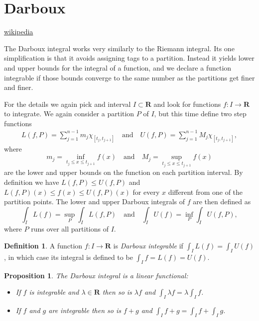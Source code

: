 \documentclass[11pt]{amsart}
\newtheorem{prop}[theo]{Proposition}
\theoremstyle{definition}
\newtheorem{defi}[theo]{Definition}
\def\qandq{\quad\text{and}\quad}
\def\RR{\mathbf{R}}
\begin{document}
\section{Darboux}

\href{https://en.wikipedia.org/wiki/Darboux_integral}{wikipedia}

The Darboux integral works very similarly to the Riemann integral.
Its one simplification is that it avoids assigning tags to a partition.
Instead it yields lower and upper bounds for the integral of a function, and we declare a function integrable if those bounds converge to the same number as the partitions get finer and finer.

For the details we again pick and interval $I \subset \RR$ and look for functions $f : I \to \RR$ to integrate.
We again consider a partition $P$ of $I$, but this time define two step functions
\begin{align*}
L(f,P) = \sum_{j=1}^{n-1} m_j \chi_{[t_j, t_{j+1}]}
\qandq
U(f,P) = \sum_{j=1}^{n-1} M_j \chi_{[t_j, t_{j+1}]},
\end{align*}
where
\[
m_j = \inf_{t_j \leq x \leq t_{j+1}} f(x)
\qandq
M_j = \sup_{t_j \leq x \leq t_{j+1}} f(x)
\]
are the lower and upper bounds on the function on each partition interval.
By definition we have $L(f,P) \leq U(f,P)$ and $L(f,P)(x) \leq f(x) \leq U(f,P)(x)$ for every $x$ different from one of the partition points.
The lower and upper Darboux integrals of $f$ are then defined as
\[
\int_I L(f) = \sup_{P} \int_I L(f,P)
\qandq
\int_I U(f) = \inf_{P} \int_I U(f,P),
\]
where $P$ runs over all partitions of $I$.


\begin{defi}
A function $f : I \to \RR$ is \emph{Darboux integrable} if $\int_I L(f) = \int_I U(f)$, in which case its integral is defined to be $\int_I f = L(f) = U(f)$.
\end{defi}


\begin{prop}
The Darboux integral is a linear functional:
\begin{itemize}
\item
If $f$ is integrable and $\lambda \in \RR$ then so is $\lambda f$ and $\int_I \lambda f = \lambda \int_I f$.

\item
If $f$ and $g$ are integrable then so is $f + g$ and $\int_I f + g = \int_I f + \int_I g$.
\end{itemize}
\end{prop}
\end{document}
